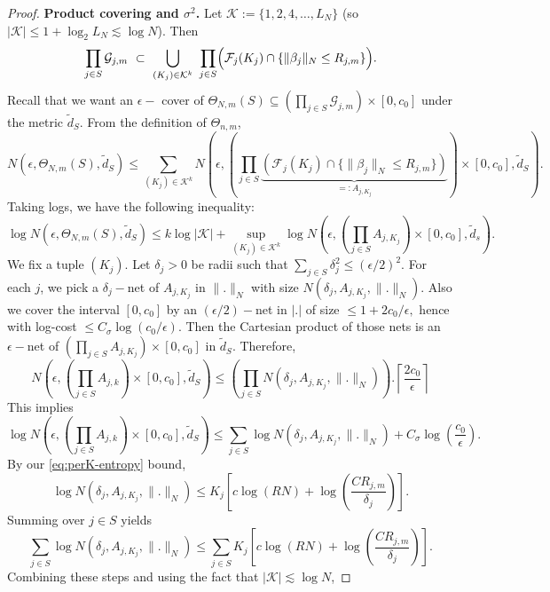 \documentclass[11pt]{article}
\theoremstyle{plain}
\theoremstyle{definition}
\theoremstyle{plain}
\begin{document}
\begin{proof}
\textbf{Product covering and $\sigma^2$.}
Let $\mathcal K:=\{1,2,4,\dots,L_N\}$ (so $|\mathcal K|\le 1+\log_2 L_N\lesssim\log N$). Then
\[
\prod_{j\in S}\mathcal G_{j,m}\ \subset\ \bigcup_{(K_j)\in\mathcal K^{k}}\ \prod_{j\in S}\Bigl(\mathcal F_j(K_j)\cap\{\|\beta_j\|_N\le R_{j,m}\}\Bigr).
\]
Recall that we want an $\epsilon-$ cover of $\Theta_{N,m}(S) \subseteq \left(\prod_{j \in S} \mathcal{G}_{j,m} \right) \times [0,c_0]$ under the metric $\tilde{d}_S$. From the definition of $\Theta_{n,m}$, 
\[
N(\epsilon,\Theta_{N,m}(S),\tilde{d}_S) \le \sum_{(K_j) \in \mathcal{K}^k} N \left( \epsilon, \left(\prod_{j \in S} \underbrace{\left(\mathcal{F}_j (K_j) \cap \{\|\beta_j\|_N \le R_{j,m}\}\right)}_{=:A_{j,K_j}}\right)\times[0,c_0],\tilde{d}_S \right). 
\]
Taking logs, we have the following inequality:
\[
\log N(\epsilon,\Theta_{N,m}(S),\tilde{d}_S) \le k \log|\mathcal{K}| + \sup_{(K_j)\in \mathcal{K}^k} \log N \left(\epsilon, \left(\prod_{j \in S} A_{j,K_j}\right) \times [0,c_0],\tilde{d}_s \right).
\]
We fix a tuple $(K_j)$. Let $\delta_j > 0$ be radii such that $\sum_{j \in S} \delta_j ^2 \le (\epsilon/2)^2.$ For each $j$, we pick a $\delta_j-$net of $A_{j,K_j}$ in $\|.\|_N$ with size $N(\delta_j,A_{j,K_j},\|.\|_N).$ Also we cover the interval $[0,c_0]$ by an $(\epsilon/2)-$net in $|.|$ of size $\le 1+2c_0/\epsilon,$ hence with log-cost $\le C_{\sigma} \log(c_0/\epsilon).$ Then the Cartesian product of those nets is an $\epsilon-$net of $(\prod_{j \in S} A_{j,K_j}) \times [0,c_0]$ in $\tilde{d}_S$. Therefore,
\[
N \left(\epsilon, \left(\prod_{j\in S} A_{j,k} \right) \times [0,c_0],\tilde{d}_S \right) \le \left(\prod_{j \in S} N(\delta_j,A_{j,K_j},\|.\|_N) \right). \left\lceil \frac{2 c_0}{\epsilon} \right\rceil 
\]
This implies \[
\log N \left(\epsilon, \left(\prod_{j\in S} A_{j,k} \right) \times [0,c_0],\tilde{d}_S \right) \le \sum_{j \in S} \log N(\delta_j,A_{j,K_j},\|.\|_N) + C_{\sigma} \log \left(\frac{c_0}{\epsilon} \right).
\]
By our \eqref{eq:perK-entropy} bound,
\[
\log N(\delta_j,A_{j,K_j},\|.\|_N) \le K_j \left[c \log(RN) + \log \left( \frac{CR_{j,m}}{\delta_j} \right) \right].
\]
Summing over $j \in S$ yields
\[
\sum_{j \in S} \log N(\delta_j,A_{j,K_j},\|.\|_N) \le \sum_{j \in S} K_j \left[c \log (RN)+ \log \left(\frac{CR_{j,m}}{\delta_j}\right)\right].
\]
Combining these steps and using the fact that $|\mathcal{K}| \lesssim \log N$,

\end{proof}
\end{document}
